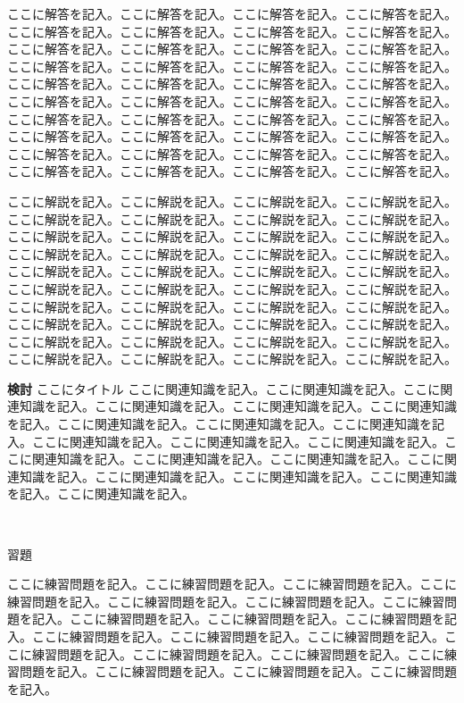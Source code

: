 \documentclass[12pt]{jarticle}
\newcommand{\rennsyuu}{\noindent\fcolorbox{white}{gray}{\textcolor{white}{練}}\colorbox[gray]{0.8}{習}\fcolorbox{white}{gray}{\textcolor{white}{問}}\colorbox[gray]{0.8}{題}}
\newenvironment{kaitou}{\noindent{\bf 解答} \dotfill}{\noindent\dotfill\\}
\begin{document}
\begin{kaitou}
\begin{multicols}{2}
\noindent ここに解答を記入。ここに解答を記入。ここに解答を記入。ここに解答を記入。ここに解答を記入。ここに解答を記入。ここに解答を記入。ここに解答を記入。ここに解答を記入。ここに解答を記入。ここに解答を記入。ここに解答を記入。ここに解答を記入。ここに解答を記入。ここに解答を記入。ここに解答を記入。ここに解答を記入。ここに解答を記入。ここに解答を記入。ここに解答を記入。ここに解答を記入。ここに解答を記入。ここに解答を記入。ここに解答を記入。ここに解答を記入。ここに解答を記入。ここに解答を記入。ここに解答を記入。ここに解答を記入。ここに解答を記入。ここに解答を記入。ここに解答を記入。ここに解答を記入。ここに解答を記入。ここに解答を記入。ここに解答を記入。ここに解答を記入。ここに解答を記入。ここに解答を記入。ここに解答を記入。

\columnbreak %

\noindent ここに解説を記入。ここに解説を記入。ここに解説を記入。ここに解説を記入。ここに解説を記入。ここに解説を記入。ここに解説を記入。ここに解説を記入。ここに解説を記入。ここに解説を記入。ここに解説を記入。ここに解説を記入。ここに解説を記入。ここに解説を記入。ここに解説を記入。ここに解説を記入。ここに解説を記入。ここに解説を記入。ここに解説を記入。ここに解説を記入。ここに解説を記入。ここに解説を記入。ここに解説を記入。ここに解説を記入。ここに解説を記入。ここに解説を記入。ここに解説を記入。ここに解説を記入。ここに解説を記入。ここに解説を記入。ここに解説を記入。ここに解説を記入。ここに解説を記入。ここに解説を記入。ここに解説を記入。ここに解説を記入。ここに解説を記入。ここに解説を記入。ここに解説を記入。ここに解説を記入。
\end{multicols}

\begin{itembox}[l]{{\bf 検討} ここにタイトル}
ここに関連知識を記入。ここに関連知識を記入。ここに関連知識を記入。ここに関連知識を記入。ここに関連知識を記入。ここに関連知識を記入。ここに関連知識を記入。ここに関連知識を記入。ここに関連知識を記入。ここに関連知識を記入。ここに関連知識を記入。ここに関連知識を記入。ここに関連知識を記入。ここに関連知識を記入。ここに関連知識を記入。ここに関連知識を記入。ここに関連知識を記入。ここに関連知識を記入。ここに関連知識を記入。ここに関連知識を記入。
\end{itembox}

\end{kaitou}

\rennsyuu

ここに練習問題を記入。ここに練習問題を記入。ここに練習問題を記入。ここに練習問題を記入。ここに練習問題を記入。ここに練習問題を記入。ここに練習問題を記入。ここに練習問題を記入。ここに練習問題を記入。ここに練習問題を記入。ここに練習問題を記入。ここに練習問題を記入。ここに練習問題を記入。ここに練習問題を記入。ここに練習問題を記入。ここに練習問題を記入。ここに練習問題を記入。ここに練習問題を記入。ここに練習問題を記入。ここに練習問題を記入。
\end{document}
